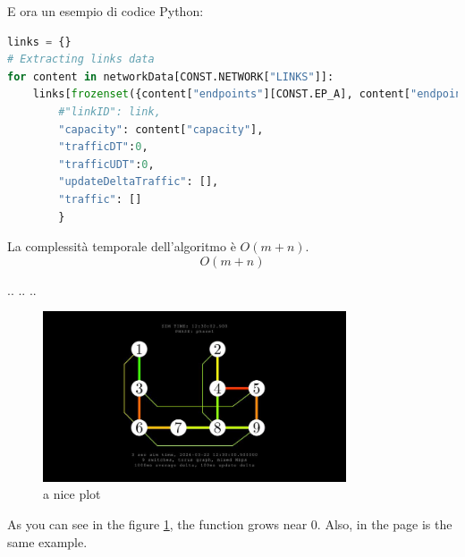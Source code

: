 \documentclass[binding=0.6cm]{sapthesis}
\begin{document}
E ora un esempio di codice Python:

\begin{lstlisting}[language=Python]
links = {}
# Extracting links data
for content in networkData[CONST.NETWORK["LINKS"]]:
    links[frozenset({content["endpoints"][CONST.EP_A], content["endpoints"][CONST.EP_B]})] = {
        #"linkID": link,
        "capacity": content["capacity"], 
        "trafficDT":0, 
        "trafficUDT":0, 
        "updateDeltaTraffic": [], 
        "traffic": []
        }
\end{lstlisting}
La complessità temporale dell'algoritmo è $O(m+n)$.
\begin{equation}
    O(m+n)
\end{equation}

.. .. ..
\begin{figure}[h]
    \centering
    \includegraphics[width=0.8\textwidth]{immagini/only_links.JPG}
    \caption{a nice plot}
    \label{fig:only_links}
\end{figure}

As you can see in the figure \ref{fig:only_links}, the 
function grows near 0. Also, in the page \pageref{fig:only_links} 
is the same example.


\printbibliography

\backmatter
\cleardoublepage
{} %
\end{document}
